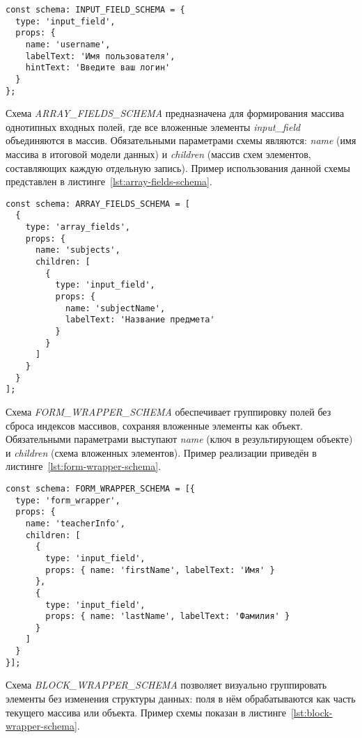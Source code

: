 \begin{lstlisting}[caption={Пример INPUT\_FIELD\_SCHEMA},label={lst:input-fields-schema}]
const schema: INPUT_FIELD_SCHEMA = {
  type: 'input_field',
  props: {
    name: 'username',
    labelText: 'Имя пользователя',
    hintText: 'Введите ваш логин'
  }
};
\end{lstlisting}

Схема \textit{ARRAY\_FIELDS\_SCHEMA} предназначена для формирования массива однотипных входных полей, где все вложенные элементы \textit{input\_field} объединяются в массив. Обязательными параметрами схемы являются: \textit{name} (имя массива в итоговой модели данных) и \textit{children} (массив схем элементов, составляющих каждую отдельную запись). Пример использования данной схемы представлен в листинге~\ref{lst:array-fields-schema}.

\begin{lstlisting}[caption={Пример \textit{ARRAY\_FIELDS\_SCHEMA}},label={lst:array-fields-schema}]
const schema: ARRAY_FIELDS_SCHEMA = [
  {
    type: 'array_fields',
    props: {
      name: 'subjects',
      children: [
        {
          type: 'input_field',
          props: {
            name: 'subjectName',
            labelText: 'Название предмета'
          }
        }
      ]
    }
  }
];
\end{lstlisting}

Схема \textit{FORM\_WRAPPER\_SCHEMA} обеспечивает группировку полей без сброса индексов массивов, сохраняя вложенные элементы как объект. Обязательными параметрами выступают \textit{name} (ключ в результирующем объекте) и \textit{children} (схема вложенных элементов). Пример реализации приведён в листинге~\ref{lst:form-wrapper-schema}.

\begin{lstlisting}[caption={Пример \textit{FORM\_WRAPPER\_SCHEMA}},label={lst:form-wrapper-schema}]
const schema: FORM_WRAPPER_SCHEMA = [{
  type: 'form_wrapper',
  props: {
    name: 'teacherInfo',
    children: [
      {
        type: 'input_field',
        props: { name: 'firstName', labelText: 'Имя' }
      },
      {
        type: 'input_field',
        props: { name: 'lastName', labelText: 'Фамилия' }
      }
    ]
  }
}];
\end{lstlisting}

Схема \textit{BLOCK\_WRAPPER\_SCHEMA} позволяет визуально группировать элементы без изменения структуры данных: поля в нём обрабатываются как часть текущего массива или объекта. Пример схемы показан в листинге~\ref{lst:block-wrapper-schema}.

